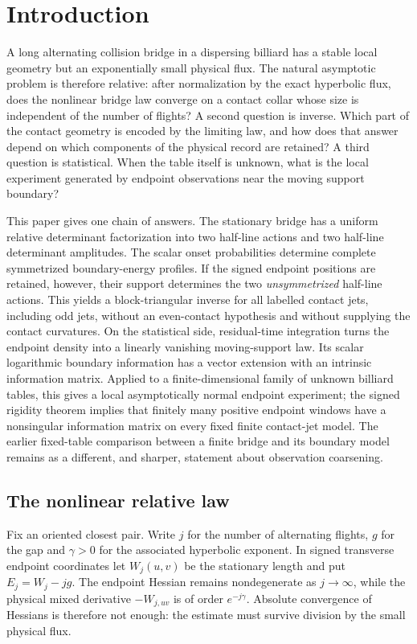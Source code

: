 \section{Introduction}
\label{sec:geometric-results}

A long alternating collision bridge in a dispersing billiard has a stable
local geometry but an exponentially small physical flux.  The natural
asymptotic problem is therefore relative: after normalization by the exact
hyperbolic flux, does the nonlinear bridge law converge on a contact collar
whose size is independent of the number of flights?  A second question is
inverse.  Which part of the contact geometry is encoded by the limiting law,
and how does that answer depend on which components of the physical record
are retained?  A third question is statistical.  When the table itself is
unknown, what is the local experiment generated by endpoint observations
near the moving support boundary?

This paper gives one chain of answers.  The stationary bridge has a uniform
relative determinant factorization into two half-line actions and two
half-line determinant amplitudes.  The scalar onset probabilities determine
complete symmetrized boundary-energy profiles.  If the signed endpoint
positions are retained, however, their support determines the two
\emph{unsymmetrized} half-line actions.  This yields a block-triangular
inverse for all labelled contact jets, including odd jets, without an
even-contact hypothesis and without supplying the contact curvatures.  On
the statistical side, residual-time integration turns the endpoint density
into a linearly vanishing moving-support law.  Its scalar logarithmic
boundary information has a vector extension with an intrinsic information
matrix.  Applied to a finite-dimensional family of unknown billiard tables,
this gives a local asymptotically normal endpoint experiment; the signed
rigidity theorem implies that finitely many positive endpoint windows have
a nonsingular information matrix on every fixed finite contact-jet model.
The earlier fixed-table comparison between a finite bridge and its boundary
model remains as a different, and sharper, statement about observation
coarsening.

\subsection{The nonlinear relative law}
Fix an oriented closest pair.  Write $j$ for the number of alternating
flights, $g$ for the gap and $\gamma>0$ for the associated hyperbolic
exponent.  In signed transverse endpoint coordinates let $W_j(u,v)$ be the
stationary length and put $E_j=W_j-jg$.  The endpoint Hessian remains
nondegenerate as $j\to\infty$, while the physical mixed derivative
$-W_{j,uv}$ is of order $e^{-j\gamma}$.  Absolute convergence of Hessians
is therefore not enough: the estimate must survive division by the small
physical flux.

